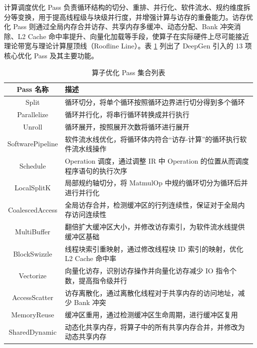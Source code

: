 计算调度优化 Pass 负责循环结构的切分、重排、并行化、软件流水、规约维度拆分等变换，用于提高线程级与块级并行度，并增强计算与访存的重叠能力。访存优化 Pass 则通过全局内存合并访存、共享内存多缓冲、动态分配、Bank 冲突消除、L2 Cache 命中率提升、向量化加载等手段，使算子在实际硬件上尽可能接近理论带宽与理论计算屋顶线（Roofline Line）。表 \ref{tab:table4} 列出了 DeepGen 引入的 13 项核心优化 Pass 及其主要功能。


\begin{table}[htbp]
\caption{算子优化 Pass 集合列表}\label{tab:table4}
\vspace{0.5em}\centering\wuhao
\renewcommand{\arraystretch}{1.35}
\begin{tabularx}{\textwidth}{c >{\centering\arraybackslash}X}
\toprule[1.5pt]
Pass 名称 & 描述 \\ \midrule[1pt]
Split & 循环切分，将单个循环按照循环边界进行切分得到多个循环 \\
Parallelize & 循环并行化，将串行循环转换成并行执行 \\
Unroll & 循环展开，按照展开次数将循环进行展开 \\
SoftwarePipeline & 软件流水线优化，将循环体内符合“访存-计算”的循环执行软件流水线操作 \\
Schedule & Operation 调度，通过调整 IR 中 Operation 的位置从而调度程序语句的执行次序 \\
LocalSplitK & 局部规约轴切分，将 MatmulOp 中规约循环切分为循环后并进行并行化 \\
CoalescedAccess & 全局访存合并，检测缓冲区的行列连续性，保证对于全局内存访问连续性 \\ 
MultiBuffer & 翻倍扩大缓冲区大小，并修改访存索引，为软件流水线提供缓冲区基础 \\ 
BlockSwizzle & 线程块索引重映射，通过修改线程块 ID 索引的映射，优化 L2 Cache 命中率 \\ 
Vectorize & 向量化访存，识别访存操作并向量化访存减少 IO 指令个数，提高指令级并行 \\ 
AccessScatter & 访存离散化，通过离散化线程对于共享内存的访问地址，减少 Bank 冲突 \\ 
MemoryReuse & 缓冲区重用，通过检测缓冲区生命周期，进行缓冲区复用 \\ 
SharedDynamic & 动态化共享内存，将算子中的所有共享内存合并，并修改为动态共享内存 \\ \bottomrule[1.5pt]
\end{tabularx}
\vspace{\baselineskip}
\end{table}


